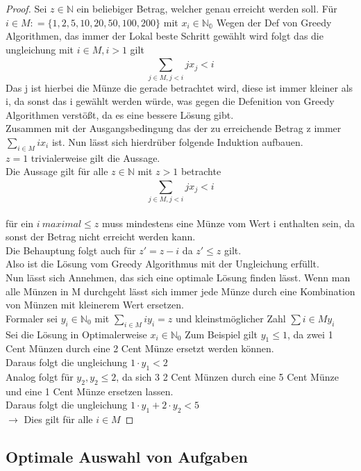 \documentclass{report}
\begin{document}
\begin{proof}
	Sei $z \in \mathbb{N}$ ein beliebiger Betrag, welcher genau erreicht werden soll. Für $i \in M : = \{1,2,5,10,20,50,100,200\}$ mit $x_{i} \in \mathbb{N_{0}}$
	Wegen der Def von Greedy Algorithmen, das immer der Lokal beste Schritt gewählt wird folgt das die ungleichung mit $i \in M, i > 1$ gilt 
	$$ \sum_{j \in M, j < i}^{}jx_{j} < i  $$
	Das j ist hierbei die Münze die gerade betrachtet wird, diese ist immer kleiner als i, da sonst das i gewählt werden würde, was gegen die Defenition von Greedy Algorithmen verstößt, da es eine bessere Lösung gibt.\\
	Zusammen mit der Ausgangsbedingung das der zu erreichende Betrag z immer $\sum_{i \in M}^{}ix_{i}$ ist. Nun lässt sich hierdrüber folgende Induktion aufbauen.\\
	 $z = 1$ trivialerweise gilt die Aussage.\\ Die Aussage gilt für alle $z \in \mathbb{N}$ mit $z > 1$ betrachte $$ \sum_{j \in M, j < i}^{}jx_{j} < i  $$ \\ für ein $i \ maximal \leq z$ muss mindestens eine Münze vom Wert i enthalten sein, da sonst der Betrag nicht erreicht werden kann.\\
	Die Behauptung folgt auch für $z' = z - i$ da $z' \leq z$ gilt.\\ 
	Also ist die Lösung vom Greedy Algorithmus mit der Ungleichung erfüllt.\\
	Nun lässt sich Annehmen, das sich eine optimale Lösung finden lässt. Wenn man alle Münzen in M durchgeht lässt sich immer jede Münze durch eine Kombination von Münzen mit kleinerem Wert ersetzen.\\
	Formaler sei $y_{i} \in \mathbb{N}_{0}$ mit $ \sum_{i \in M} iy_{i} = z $ und kleinstmöglicher Zahl $\sum{i \in M} y_{i}$\\
	Sei die Lösung in Optimalerweise $x_{i} \in \mathbb{N}_{0}$ Zum Beispiel gilt $y_{1} \leq 1$, da zwei 1 Cent Münzen durch eine 2 Cent Münze ersetzt werden können.\\
	Daraus folgt die ungleichung $1 \cdot y_{1} < 2$\\
	Analog folgt für $y_{2}, y_{2} \leq 2$, da sich 3 2 Cent Münzen durch eine 5 Cent Münze und eine 1 Cent Münze ersetzen lassen.\\
	Daraus folgt die ungleichung $1 \cdot y_{1} + 2 \cdot y_{2} < 5$\\ $\rightarrow$ Dies gilt für alle $i \in M$
\end{proof} 
\subsection{Optimale Auswahl von Aufgaben}
\end{document}
